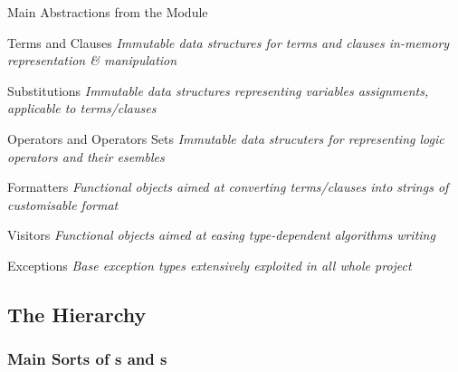 \documentclass[handout]{beamer}
\begin{document}
\begin{frame}[allowframebreaks]{Main Abstractions from the  Module}
    \begin{block}{Terms and Clauses}\center\itshape\small
        Immutable data structures for terms and clauses in-memory representation \& manipulation
    \end{block}

    \begin{block}{Substitutions}\center\itshape\small
        Immutable data structures representing variables assignments, applicable to terms/clauses
    \end{block}

    \begin{block}{Operators and Operators Sets}\center\itshape\small
        Immutable data strucuters for representing logic operators and their esembles
    \end{block}

    \framebreak

    \begin{block}{Formatters}\center\itshape\small
        Functional objects aimed at converting terms/clauses into strings of customisable format
    \end{block}

    \begin{block}{Visitors}\center\itshape\small
        Functional objects aimed at easing type-dependent algorithms writing
    \end{block}

    \begin{block}{Exceptions}\center\itshape\small
        Base exception types extensively exploited in all whole \twopkt{} project
    \end{block}
\end{frame}

\subsection{The  Hierarchy}

\subsubsection{Main Sorts of s and s}
\end{document}
